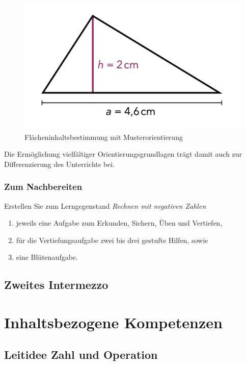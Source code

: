 \documentclass[
]{scrbook}
\theoremstyle{definition}
\theoremstyle{definition}
\theoremstyle{definition}
\theoremstyle{definition}
\theoremstyle{remark}
\begin{document}
\begin{figure}

{\centering \includegraphics[width=0.5\linewidth]{pictures/8-Aufgabenorientierung} 

}

\caption{Flächeninhaltsbestimmung mit Musterorientierung}\label{fig:Aufgabenorientierung}
\end{figure}

Die Ermöglichung vielfältiger Orientierungsgrundlagen trägt damit auch zur Differenzierung des Unterrichts bei.

\hypertarget{aufgaben-gestalten-nachbereitung}{%
\section{Zum Nachbereiten}\label{aufgaben-gestalten-nachbereitung}}

Erstellen Sie zum Lerngegenstand \emph{Rechnen mit negativen Zahlen}

\begin{enumerate}
\def\labelenumi{\alph{enumi})}
\item
  jeweils eine Aufgabe zum Erkunden, Sichern, Üben und Vertiefen,
\item
  für die Vertiefungsaufgabe zwei bis drei gestufte Hilfen, sowie
\item
  eine Blütenaufgabe.
\end{enumerate}

\hypertarget{zweites-intermezzo}{%
\chapter{Zweites Intermezzo}\label{zweites-intermezzo}}

\hypertarget{part-inhaltsbezogene-kompetenzen}{%
\part*{Inhaltsbezogene Kompetenzen}\label{part-inhaltsbezogene-kompetenzen}}

\hypertarget{leitidee-zahl-und-operation}{%
\chapter{Leitidee Zahl und Operation}\label{leitidee-zahl-und-operation}}
\end{document}
